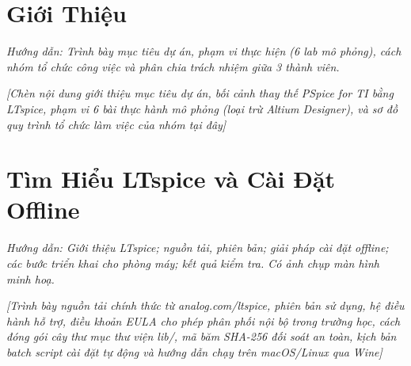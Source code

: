 \documentclass[12pt,a4paper]{report}
\begin{document}
\chapter{Giới Thiệu}

\textit{\color{guidegray}
Hướng dẫn: Trình bày mục tiêu dự án, phạm vi thực hiện (6 lab mô phỏng), cách nhóm tổ chức công việc và phân chia trách nhiệm giữa 3 thành viên.
}

\begin{orangebox}
\textit{\color{guidegray}[Chèn nội dung giới thiệu mục tiêu dự án, bối cảnh thay thế PSpice for TI bằng LTspice, phạm vi 6 bài thực hành mô phỏng (loại trừ Altium Designer), và sơ đồ quy trình tổ chức làm việc của nhóm tại đây]}
\end{orangebox}

\chapter{Tìm Hiểu LTspice và Cài Đặt Offline}

\textit{\color{guidegray}
Hướng dẫn: Giới thiệu LTspice; nguồn tải, phiên bản; giải pháp cài đặt offline; các bước triển khai cho phòng máy; kết quả kiểm tra. Có ảnh chụp màn hình minh hoạ.
}

\begin{orangebox}
\textit{\color{guidegray}[Trình bày nguồn tải chính thức từ analog.com/ltspice, phiên bản sử dụng, hệ điều hành hỗ trợ, điều khoản EULA cho phép phân phối nội bộ trong trường học, cách đóng gói cây thư mục thư viện lib/, mã băm SHA-256 đối soát an toàn, kịch bản batch script cài đặt tự động và hướng dẫn chạy trên macOS/Linux qua Wine]}
\end{orangebox}

\begin{orangebox}
\centering
\vspace{0.5cm}
\vspace{0.5cm}
\end{orangebox}
\end{document}
